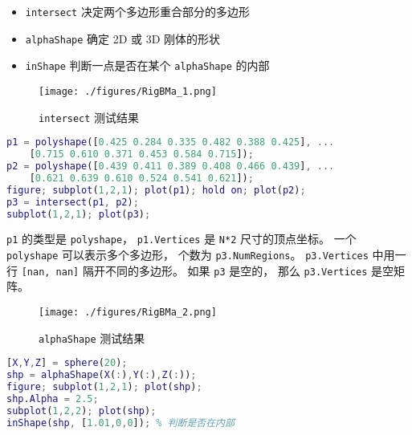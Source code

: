 
\begin{issues}
\issueDraft
\end{issues}

\begin{itemize}
\item \verb|intersect| 决定两个多边形重合部分的多边形
\item \verb|alphaShape| 确定 2D 或 3D 刚体的形状
\item \verb|inShape| 判断一点是否在某个 \verb|alphaShape| 的内部
\end{itemize}

\begin{figure}[ht]
\centering
\texttt{[image: ./figures/RigBMa\_1.png]}
\caption{\lstinline|intersect| 测试结果} \label{RigBMa_fig1}
\end{figure}

\begin{lstlisting}[language=matlab]
p1 = polyshape([0.425 0.284 0.335 0.482 0.388 0.425], ...
    [0.715 0.610 0.371 0.453 0.584 0.715]);
p2 = polyshape([0.439 0.411 0.389 0.408 0.466 0.439], ...
    [0.621 0.639 0.610 0.524 0.541 0.621]);
figure; subplot(1,2,1); plot(p1); hold on; plot(p2);
p3 = intersect(p1, p2);
subplot(1,2,1); plot(p3);
\end{lstlisting}
\verb|p1| 的类型是 \verb|polyshape|， \verb|p1.Vertices| 是 \verb|N*2| 尺寸的顶点坐标。 一个 \verb|polyshape| 可以表示多个多边形， 个数为 \verb|p3.NumRegions|。 \verb|p3.Vertices| 中用一行 \verb|[nan, nan]| 隔开不同的多边形。 如果 \verb|p3| 是空的， 那么 \verb|p3.Vertices| 是空矩阵。


\begin{figure}[ht]
\centering
\texttt{[image: ./figures/RigBMa\_2.png]}
\caption{\lstinline|alphaShape| 测试结果} \label{RigBMa_fig2}
\end{figure}

\begin{lstlisting}[language=matlab]
[X,Y,Z] = sphere(20);
shp = alphaShape(X(:),Y(:),Z(:));
figure; subplot(1,2,1); plot(shp);
shp.Alpha = 2.5;
subplot(1,2,2); plot(shp);
inShape(shp, [1.01,0,0]); % 判断是否在内部
\end{lstlisting}
